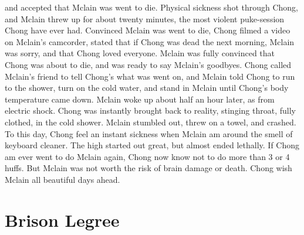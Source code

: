 \documentclass[12pt]{book}
\begin{document}
and accepted that Mclain was went to die. Physical sickness shot through Chong, and Mclain threw up for about twenty minutes, the most violent puke-session Chong have ever had. Convinced Mclain was went to die, Chong filmed a video on Mclain's camcorder, stated that if Chong was dead the next morning, Mclain was sorry, and that Chong loved everyone. Mclain was fully convinced that Chong was about to die, and was ready to say Mclain's goodbyes. Chong called Mclain's friend to tell Chong's what was went on, and Mclain told Chong to run to the shower, turn on the cold water, and stand in Mclain until Chong's body temperature came down. Mclain woke up about half an hour later, as from electric shock. Chong was instantly brought back to reality, stinging throat, fully clothed, in the cold shower. Mclain stumbled out, threw on a towel, and crashed. To this day, Chong feel an instant sickness when Mclain am around the smell of keyboard cleaner. The high started out great, but almost ended lethally. If Chong am ever went to do Mclain again, Chong now know not to do more than 3 or 4 huffs. But Mclain was not worth the risk of brain damage or death. Chong wish Mclain all beautiful days ahead.



\chapter{Brison Legree}
\end{document}
